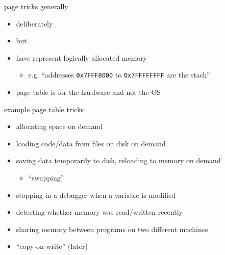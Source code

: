 \begin{frame}{page tricks generally}
\begin{itemize}
\item deliberately 
\item but 
\vspace{.5cm}
\item have  represent logically allocated memory
    \begin{itemize}
    \item e.g. ``addresses {\tt 0x7FFF8000} to {\tt 0x7FFFFFFFF} are the stack''
    \end{itemize}
\item page table is for the hardware and not the OS
\end{itemize}
\end{frame}

\begin{frame}{example page table tricks}
    \begin{itemize}
    \item allocating space on demand
    \item loading code/data from files on disk on demand
    \item saving data temporarily to disk, reloading to memory on demand
        \begin{itemize}
        \item ``swapping''
        \end{itemize}
    \item stopping in a debugger when a variable is modified
    \item detecting whether memory was read/written recently
    \item sharing memory between programs on two different machines
    \item ``copy-on-write'' (later)
    \end{itemize}
\end{frame}

